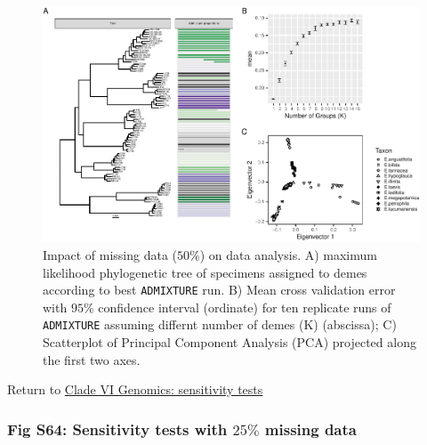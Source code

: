 \documentclass[
  11pt,
]{article}
\begin{document}
\begin{figure}
\includegraphics{Supplementary_Material_files/figure-latex/cladeVIgenomicSensitivityAnalysesMiddleplots-1} \caption{Impact of missing data ($50\%$) on data analysis. A) maximum likelihood phylogenetic tree of specimens assigned to demes according to best \texttt{ADMIXTURE} run. B) Mean cross validation error with $95\%$ confidence interval (ordinate) for ten replicate runs of \texttt{ADMIXTURE} assuming differnt number of demes (K) (abscissa); C) Scatterplot of Principal Component Analysis (PCA) projected along the first two axes.}\label{fig:cladeVIgenomicSensitivityAnalysesMiddleplots}
\end{figure}

Return to \protect\hyperlink{sensitivity-tests-5}{Clade VI Genomics: sensitivity tests}
\pagebreak

\hypertarget{fig-s64-sensitivity-tests-with-25-missing-data}{%
\subsubsection{\texorpdfstring{Fig S64: Sensitivity tests with \(25\%\) missing data}{Fig S64: Sensitivity tests with 25\textbackslash\% missing data}}\label{fig-s64-sensitivity-tests-with-25-missing-data}}
\end{document}
